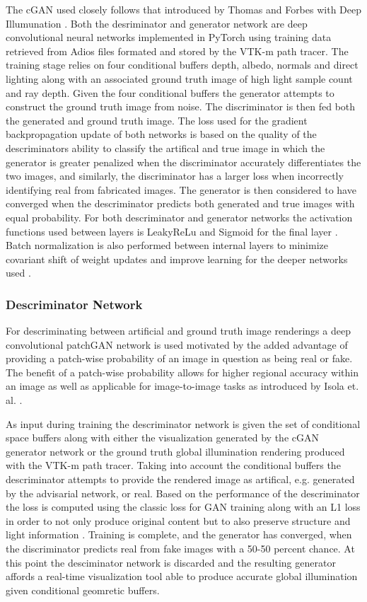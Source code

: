 \documentclass[sigconf,authordraft]{acmart}
\begin{document}
The cGAN used closely follows that introduced by Thomas and Forbes with Deep Illumunation \cite{deepillum}. Both the desriminator and generator network are deep convolutional neural networks implemented in PyTorch using training data retrieved from Adios files formated and stored by the VTK-m path tracer. The training stage relies on four conditional buffers depth, albedo, normals and direct lighting along with an associated ground truth image of high light sample count and ray depth. Given the four conditional buffers the generator attempts to construct the ground truth image from noise. The discriminator is then fed both the generated and ground truth image. The loss used for the gradient backpropagation update of both networks is based on the quality of the descriminators ability to classify the artifical and true image in which the generator is greater penalized when the discriminator accurately differentiates the two images, and similarly, the discriminator has a larger loss when incorrectly identifying real from fabricated images. The generator is then considered to have converged when the descriminator predicts both generated and true images with equal probability. For both descriminator and generator networks the activation functions used between layers is LeakyReLu and Sigmoid for the final layer \cite{maasLeaky}. Batch normalization is also performed between internal layers to minimize covariant shift of weight updates and improve learning for the deeper networks used \cite{ioffeBatch}.

\subsubsection{Descriminator Network}

For descriminating between artificial and ground truth image renderings a deep convolutional patchGAN network is used motivated by the added advantage of providing a patch-wise probability of an image in question as being real or fake. The benefit of a patch-wise probability allows for higher regional accuracy within an image as well as applicable for image-to-image tasks as introduced by Isola et. al. \cite{isolaPatch}. 

As input during training the descriminator network is given the set of conditional space buffers along with either the visualization generated by the cGAN generator network or the ground truth global illumination rendering produced with the VTK-m path tracer. Taking into account the conditional buffers the descriminator attempts to provide the rendered image as artifical, e.g. generated by the advisarial network, or real. Based on the performance of the descriminator the loss is computed using the classic loss for GAN training along with an L1 loss in order to not only produce original content but to also preserve structure and light information \cite{isolaL1}. Training is complete, and the generator has converged, when the discriminator predicts real from fake images with a 50-50 percent chance. At this point the desciminator network is discarded and the resulting generator affords a real-time visualization tool able to produce accurate global illumination given conditional geomretic buffers.
\end{document}
